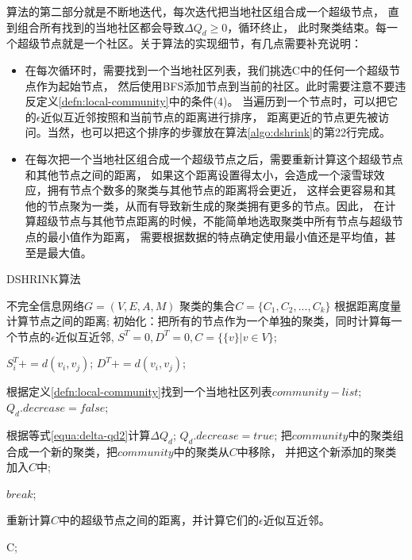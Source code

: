 算法的第二部分就是不断地迭代，每次迭代把当地社区组合成一个超级节点，
直到组合所有找到的当地社区都会导致$\Delta Q_d \geq 0$，循环终止，
此时聚类结束。每一个超级节点就是一个社区。关于算法的实现细节，有几点需要补充说明：

\begin{itemize}
    \item 在每次循环时，需要找到一个当地社区列表，我们挑选C中的任何一个超级节点作为起始节点，
    然后使用BFS添加节点到当前的社区。此时需要注意不要违反定义\ref{defn:local-community}中的条件(4)。
    当遍历到一个节点时，可以把它的$\epsilon$近似互近邻按照和当前节点的距离进行排序，
    距离更近的节点更先被访问。当然，也可以把这个排序的步骤放在算法\ref{algo:dshrink}的第22行完成。

    \item 在每次把一个当地社区组合成一个超级节点之后，需要重新计算这个超级节点和其他节点之间的距离，
    如果这个距离设置得太小，会造成一个滚雪球效应，拥有节点个数多的聚类与其他节点的距离将会更近，
    这样会更容易和其他的节点聚为一类，从而有导致新生成的聚类拥有更多的节点。因此，
    在计算超级节点与其他节点距离的时候，不能简单地选取聚类中所有节点与超级节点的最小值作为距离，
    需要根据数据的特点确定使用最小值还是平均值，甚至是最大值。
\end{itemize}


\begin{algorithm}[htb]
    \caption{DSHRINK算法}
    \label{algo:dshrink}
    \begin{algorithmic}[1]
        \Require
        不完全信息网络$G = (V, E, A, M)$
        \Ensure
        聚类的集合$C = \{C_1, C_2, ..., C_k\}$
        \State 根据距离度量计算节点之间的距离;
        \State 初始化：把所有的节点作为一个单独的聚类，同时计算每一个节点的$\epsilon$近似互近邻,
        $S^T = 0, D^T = 0, C = \{\{v\} | v \in V \}$;

                \State $S_i^T += d(v_i, v_j)$;
                \State $D^T += d(v_i, v_j)$;
            \EndFor
        \EndFor

            \State 根据定义\ref{defn:local-community}找到一个当地社区列表$community-list$;
            \State $Q_d.decrease = false$;

                \State 根据等式\ref{equa:delta-qd2}计算$\Delta Q_d$;
                    \State $Q_d.decrease = true$;
                    \State 把$community$中的聚类组合成一个新的聚类，把$community$中的聚类从$C$中移除，
                    并把这个新添加的聚类加入$C$中;
                \EndIf
            \EndFor

                \State $break$;
            \EndIf

            \State 重新计算$C$中的超级节点之间的距离，并计算它们的$\epsilon$近似互近邻。
        \EndWhile

        \Return C;

    \end{algorithmic}
\end{algorithm}

